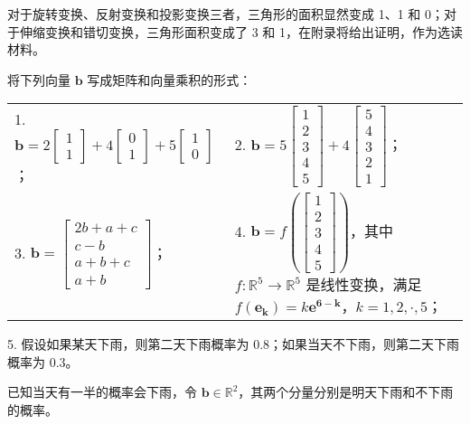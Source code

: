 	\begin{solution}
		对于旋转变换、反射变换和投影变换三者，三角形的面积显然变成 1、1 和 0；对于伸缩变换和错切变换，三角形面积变成了 3 和 1，在附录将给出证明，作为选读材料。
	\end{solution}
	
	\begin{exercise}[1.2.1]
		将下列向量 $\boldsymbol{b}$ 写成矩阵和向量乘积的形式：
		\begin{table}[htbp]
			\centering
			\begin{tabular}{p{0.45\textwidth}p{}}
				1. $\boldsymbol{b}=2\begin{bmatrix}
					1\\1
				\end{bmatrix}+4\begin{bmatrix}
					0\\1
				\end{bmatrix}+5\begin{bmatrix}
					1\\0
				\end{bmatrix}$； & 2. $\boldsymbol{b}=5\begin{bmatrix}
					1\\2\\3\\4\\5
				\end{bmatrix}+4\begin{bmatrix}
					5\\4\\3\\2\\1
				\end{bmatrix}$；\\
				3. $\boldsymbol{b}=\begin{bmatrix}
					2b+a+c\\c-b\\a+b+c\\a+b
				\end{bmatrix}$；&4. $\boldsymbol{b}=f\left(\begin{bmatrix}
					1\\2\\3\\4\\5
				\end{bmatrix}\right)$，其中 $f:\mathbb{R}^5\rightarrow\mathbb{R}^5$ 是线性变换，满足 $f(\boldsymbol{e_k})=k\boldsymbol{e^{6-k}}$，$k=1,2,\cdot,5$；
			\end{tabular}
		\end{table}
		
		5. 假设如果某天下雨，则第二天下雨概率为 0.8；如果当天不下雨，则第二天下雨概率为 0.3。
		
		已知当天有一半的概率会下雨，令 $\boldsymbol{b}\in\mathbb{R}^2$，其两个分量分别是明天下雨和不下雨的概率。
	\end{exercise}
	
